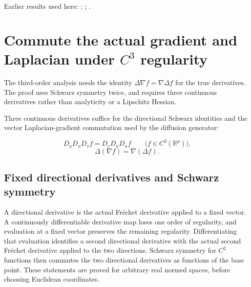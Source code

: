 \documentclass[11pt,a4paper]{report}
\begin{document}
Earlier results used here: \cite[Section~3.26.2]{LangevinLean2026ULASC}; \cite[Section~3.26.3]{LangevinLean2026ULASC}; \cite[Section~3.26.9]{LangevinLean2026ULASC}.
\section{\texorpdfstring{Commute the actual gradient and Laplacian under \(C^{3}\) regularity}{Commute the actual gradient and Laplacian under C³ regularity}}
\label{proof-module-AverageLMC-LaplacianGradient-lean}


The third-order analysis needs the identity \(\Delta \nabla f=\nabla \Delta f\) for the true derivatives. The proof uses Schwarz symmetry twice, and requires three continuous derivatives rather than analyticity or a Lipschitz Hessian.



Three continuous derivatives suffice for the directional Schwarz identities and the vector Laplacian-gradient commutation used by the diffusion generator:


\[D_uD_uD_vf=D_vD_uD_uf\qquad\bigl(f\in C^3(\mathbb R^p)\bigr).\]
\[\Delta(\nabla f)=\nabla(\Delta f).\]\subsection{\texorpdfstring{Fixed directional derivatives and Schwarz symmetry}{Fixed directional derivatives and Schwarz symmetry}}
\label{report-step-AverageLMC-LaplacianGradient-lean-1}


A directional derivative is the actual Fréchet derivative applied to a fixed vector. A continuously differentiable derivative map loses one order of regularity, and evaluation at a fixed vector preserves the remaining regularity. Differentiating that evaluation identifies a second directional derivative with the actual second Fréchet derivative applied to the two directions. Schwarz symmetry for \(C^{2}\) functions then commutes the two directional derivatives as functions of the base point. These statements are proved for arbitrary real normed spaces, before choosing Euclidean coordinates.
\end{document}
